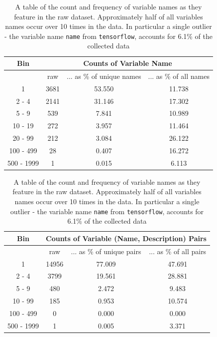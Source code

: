 \begin{table}[p]
    \begin{center}
    \begin{tabular}{c | c | c | c  }       
        Bin   & \multicolumn{3}{c}{Counts of Variable Name}   \\
        \hline
        &     raw &... as \% of unique names & ... as \% of all names   \\  
        \hline     
        1     &      3681 &   53.550 &   11.738  \\          
        2 - 4 &      2141 &   31.146 &   17.302  \\          
        5 - 9 &       539 &    7.841 &   10.989  \\          
        10 - 19 &     272 &    3.957 &   11.464  \\          
        20 - 99 &     212 &    3.084 &   26.122  \\          
        100 - 499 &    28 &    0.407 &   16.272  \\          
        500 - 1999 &    1 &    0.015 &    6.113  \\                

    \end{tabular}
        \caption { A table of the count and frequency of variable names as they feature in the raw dataset. Approximately half of all variables names occur over 10 times in the data. In particular a single outlier - the variable name \texttt{name} from \texttt{tensorflow}, accounts for 6.1\% of the collected data}
    \label{table:variable_histogram}

    \begin{tabular}{c | c | c | c  }          

        Bin   & \multicolumn{3}{c}{Counts of Variable (Name, Description) Pairs}  \\
        \hline
        &     raw &... as \% of unique pairs & ... as \% of all pairs  \\  
        \hline     
        1 &     14956 &   77.009 &   47.691  \\
        2 - 4 &      3799 &   19.561 &   28.881 \\
        5 - 9 &       480 &    2.472 &    9.483 \\
        10 - 99 &     185 &    0.953 &   10.574 \\
        100 - 499 &     0 &    0.000 &    0.000 \\
        500 - 1999 &    1 &    0.005 &    3.371 \\           


\end{tabular}
\end{center}
\end{table}
